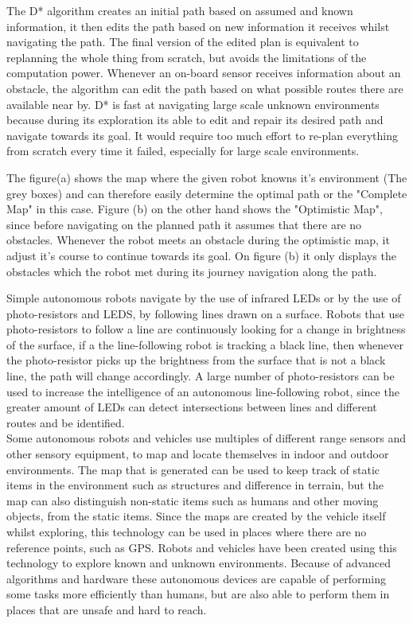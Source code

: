 The D* algorithm creates an initial path based on assumed and known information, it then edits the path based on new information it receives whilst navigating the path. The final version of the edited plan is equivalent to replanning the whole thing from scratch, but avoids the limitations of the computation power.
Whenever an on-board sensor receives information about an obstacle, the algorithm can edit the path based on what possible routes there are available near by.
D* is fast at navigating large scale unknown environments because during its exploration its able to edit and repair its desired path and navigate towards its goal. It would require too much effort to re-plan everything from scratch every time it failed, especially for large scale environments.\cite{dstar}\cite{moredstar}

The figure(a) shows the map where the given robot knowns it's environment (The grey boxes) and can therefore easily determine the optimal path or the "Complete Map" in this case. Figure (b) on the other hand shows the "Optimistic Map", since before navigating on the planned path it assumes that there are no obstacles. Whenever the robot meets an obstacle during the optimistic map, it adjust it's course to continue towards its goal. On figure (b) it only displays the obstacles which the robot met during its journey navigation along the path.




Simple autonomous robots navigate by the use of infrared LEDs or by the use of photo-resistors and LEDS, by following lines drawn on a surface. Robots that use photo-resistors to follow a line are continuously looking for a change in brightness of the surface, if a the line-following robot is tracking a black line, then whenever the photo-resistor picks up the brightness from the surface that is not a black line, the path will change accordingly. A large number of photo-resistors can be used to increase the intelligence of an autonomous line-following robot, since the greater amount of LEDs can detect intersections between lines and different routes and be identified.\cite{linetrack}\\
Some autonomous robots and vehicles use multiples of different range sensors and other sensory equipment, to map and locate themselves in indoor and outdoor environments. The map that is generated can be used to keep track of static items in the environment such as structures and difference in terrain, but the map can also distinguish non-static items such as humans and other moving objects, from the static items. Since the maps are created by the vehicle itself whilst exploring, this technology can be used in places where there are no reference points, such as GPS\cite{rangesens}\cite{rangesensarc}. Robots and vehicles have been created using this technology to explore known and unknown environments. Because of advanced algorithms and hardware these autonomous devices are capable of performing some tasks more efficiently than humans, but are also able to perform them in places that are unsafe and hard to reach. %

